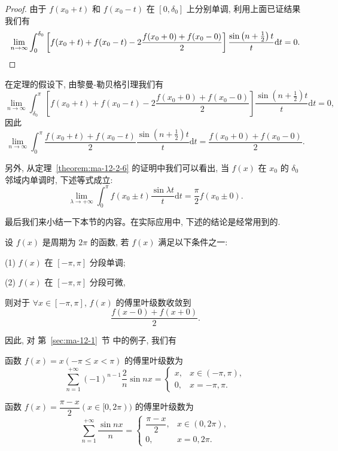 \begin{proof}
由于 $f(x_0+t)$ 和 $f(x_0-t)$ 在 $[0,\delta_0]$ 上分别单调, 利用上面已证结果我们有
\[
  \lim_{n\to\infty}\int_0^{\delta_0}
  \left[
    f(x_0+t)+f(x_0-t)-2\frac{f(x_0+0)+f(x_0-0)}{2}
  \right]
  \frac{\sin\left(n+\frac12\right)t}{t}\mathrm dt=0.
\qedhere
\]
\end{proof}


\begin{remark}\label{remark:ma-12-source-25}
在定理的假设下, 由黎曼-勒贝格引理我们有
\[
  \lim_{n\to\infty}\int_{\delta_0}^\pi
  \left[
    f(x_0+t)+f(x_0-t)-2\frac{f(x_0+0)+f(x_0-0)}{2}
  \right]
  \frac{\sin\left(n+\frac12\right)t}{t}\mathrm dt=0,
\]
因此
\[
  \lim_{n\to\infty}\int_0^\pi
  \frac{f(x_0+t)+f(x_0-t)}{2}
  \frac{\sin\left(n+\frac12\right)t}{t}\mathrm dt
  =
  \frac{f(x_0+0)+f(x_0-0)}{2}.
\]
\end{remark}

另外, 从定理~\ref{theorem:ma-12-2-6} 的证明中我们可以看出, 当 $f(x)$ 在 $x_0$ 的 $\delta_0$ 邻域内单调时, 下述等式成立:
\[
  \lim_{\lambda\to+\infty}\int_0^\pi f(x_0\pm t)\frac{\sin\lambda t}{t}\mathrm dt
  =\frac{\pi}{2}f(x_0\pm0).
\]

最后我们来小结一下本节的内容。在实际应用中, 下述的结论是经常用到的.

设 $f(x)$ 是周期为 $2\pi$ 的函数, 若 $f(x)$ 满足以下条件之一:

(1) $f(x)$ 在 $[-\pi,\pi]$ 分段单调;

(2) $f(x)$ 在 $[-\pi,\pi]$ 分段可微,

则对于 $\forall x\in[-\pi,\pi]$, $f(x)$ 的傅里叶级数收敛到
\[
  \frac{f(x-0)+f(x+0)}{2}.
\]

因此, 对 第~\ref{sec:ma-12-1}~节 中的例子, 我们有

\begin{example}\label{example:ma-12-2-1}
函数 $f(x)=x(-\pi\leqslant x<\pi)$ 的傅里叶级数为
\[
  \sum_{n=1}^{+\infty}(-1)^{n-1}\frac2n\sin nx
  =
  \begin{cases}
    x, & x\in(-\pi,\pi),\\
    0, & x=-\pi,\pi.
  \end{cases}
\]
\end{example}


\begin{example}\label{example:ma-12-2-2}
函数 $f(x)=\dfrac{\pi-x}{2}(x\in[0,2\pi))$ 的傅里叶级数为
\[
  \sum_{n=1}^{+\infty}\frac{\sin nx}{n}
  =
  \begin{cases}
    \dfrac{\pi-x}{2}, & x\in(0,2\pi),\\
    0, & x=0,2\pi.
  \end{cases}
\]
\end{example}


